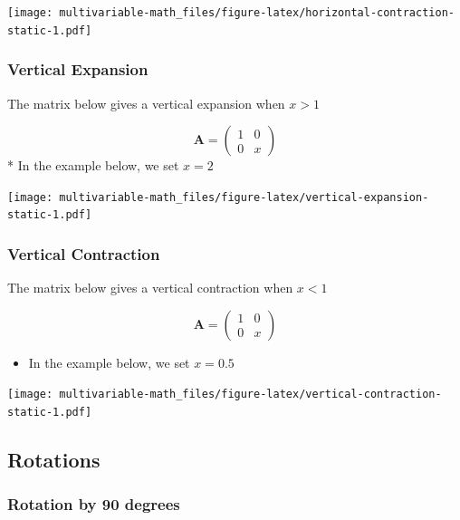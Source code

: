 \documentclass[
]{book}
\providecommand{\tightlist}{%
  \setlength{\itemsep}{0pt}\setlength{\parskip}{0pt}}
\theoremstyle{definition}
\theoremstyle{definition}
\theoremstyle{definition}
\theoremstyle{remark}
\begin{document}
\texttt{[image: multivariable-math\_files/figure-latex/horizontal-contraction-static-1.pdf]}

\hypertarget{vertical-expansion}{%
\subsubsection{Vertical Expansion}\label{vertical-expansion}}

The matrix below gives a vertical expansion when \(x > 1\)

\[
\mathbf{A} = \begin{pmatrix}
1 & 0 \\
0 & x
\end{pmatrix}
\]
* In the example below, we set \(x = 2\)

\texttt{[image: multivariable-math\_files/figure-latex/vertical-expansion-static-1.pdf]}

\hypertarget{vertical-contraction}{%
\subsubsection{Vertical Contraction}\label{vertical-contraction}}

The matrix below gives a vertical contraction when \(x < 1\)

\[
\mathbf{A} = \begin{pmatrix}
1 & 0 \\
0 & x
\end{pmatrix}
\]

\begin{itemize}
\tightlist
\item
  In the example below, we set \(x = 0.5\)
\end{itemize}

\texttt{[image: multivariable-math\_files/figure-latex/vertical-contraction-static-1.pdf]}

\hypertarget{rotations}{%
\subsection{Rotations}\label{rotations}}

\hypertarget{rotation-by-90-degrees}{%
\subsubsection{Rotation by 90 degrees}\label{rotation-by-90-degrees}}
\end{document}
